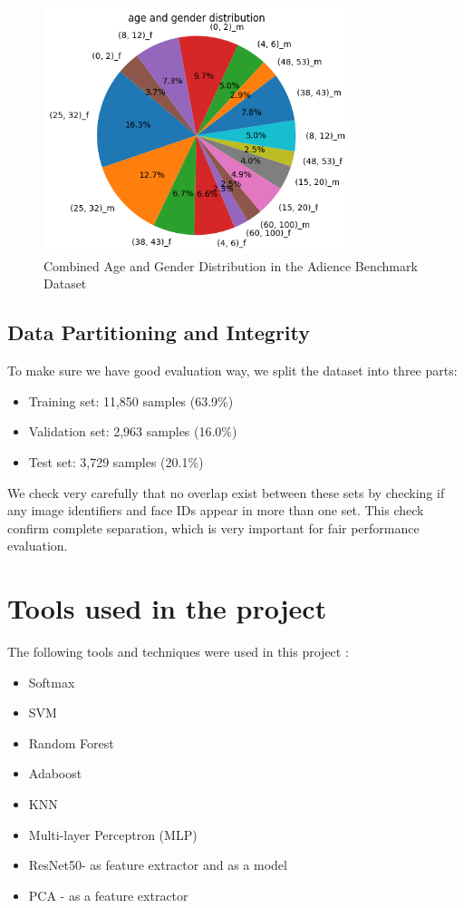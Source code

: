 \documentclass{article}
\begin{document}
\begin{figure}[H]
    \centering
    \includegraphics[width=0.8\textwidth]{assets/age and gender distribution.png}
    \caption{Combined Age and Gender Distribution in the Adience Benchmark Dataset}
\end{figure}

\subsection{Data Partitioning and Integrity}
To make sure we have good evaluation way, we split the dataset into three parts:

\begin{itemize}
    \item Training set: 11,850 samples (63.9\%)
    \item Validation set: 2,963 samples (16.0\%)
    \item Test set: 3,729 samples (20.1\%)
\end{itemize}

We check very carefully that no overlap exist between these sets by checking if any image identifiers and face IDs appear in more than one set. This check confirm complete separation, which is very important for fair performance evaluation.


\newpage
\section*{Tools used in the project}

The following tools and techniques were used in this project :

\begin{itemize}
    \item Softmax
    \item SVM
    \item Random Forest
    \item Adaboost
    \item KNN
    \item Multi-layer Perceptron (MLP)
    \item ResNet50- as feature extractor and as a model
    \item PCA - as a feature extractor
\end{itemize}
\end{document}
